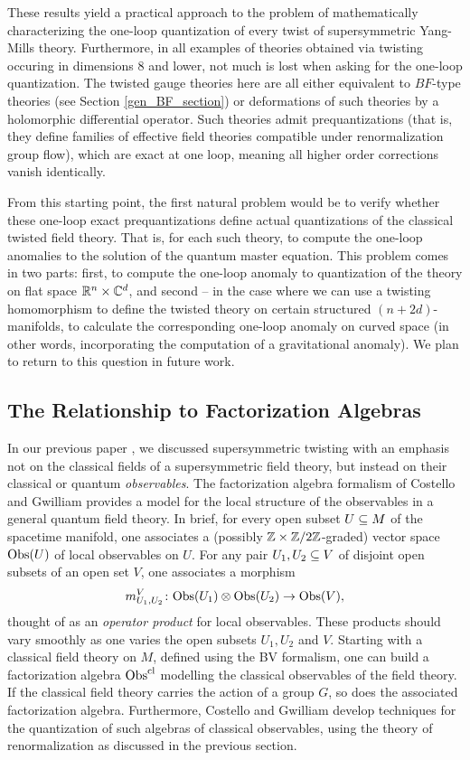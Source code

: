 \documentclass[10pt, oneside]{article}
\begin{document}
These results yield a practical approach to the problem of mathematically characterizing the one-loop quantization of every twist of supersymmetric Yang-Mills theory. Furthermore, in all examples of theories obtained via twisting occuring in dimensions 8 and lower, not much is lost when asking for the one-loop quantization.  The twisted gauge theories here are all either equivalent to $BF$-type theories (see Section \ref{gen_BF_section}) or deformations of such theories by a holomorphic differential operator.  Such theories admit prequantizations (that is, they define families of effective field theories compatible under renormalization group flow), which are exact at one loop, meaning all higher order corrections vanish identically.  

From this starting point, the first natural problem would be to verify whether these one-loop exact prequantizations define actual quantizations of the classical twisted field theory.  That is, for each such theory, to compute the one-loop anomalies to the solution of the quantum master equation.  This problem comes in two parts: first, to compute the one-loop anomaly to quantization of the theory on flat space $\mathbb R^n \times \mathbb C^d$, and second -- in the case where we can use a twisting homomorphism to define the twisted theory on certain structured $(n+2d)$-manifolds, to calculate the corresponding one-loop anomaly on curved space (in other words, incorporating the computation of a gravitational anomaly). We plan to return to this question in future work.

\subsection*{The Relationship to Factorization Algebras}
In our previous paper \cite{ElliottSafronov}, we discussed supersymmetric twisting with an emphasis not on the classical fields of a supersymmetric field theory, but instead on their classical or quantum \emph{observables}.  The factorization algebra formalism of Costello and Gwilliam \cite{Book1, Book2} provides a model for the local structure of the observables in a general quantum field theory.  In brief, for every open subset $U \subseteq M$ of the spacetime manifold, one associates a (possibly $\mathbb Z \times \mathbb Z/2\mathbb Z$-graded) vector space $\mathrm{Obs}(U)$ of local observables on $U$.  For any pair $U_1, U_2 \subseteq V$ of disjoint open subsets of an open set $V$, one associates a morphism
\[m_{U_1, U_2}^V \colon \mathrm{Obs}(U_1) \otimes \mathrm{Obs}(U_2)\to \mathrm{Obs}(V),\]
thought of as an \emph{operator product} for local observables.  These products should vary smoothly as one varies the open subsets $U_1, U_2$ and $V$.  Starting with a classical field theory on $M$, defined using the BV formalism, one can build a factorization algebra $\mathrm{Obs}^{\mathrm{cl}}$ modelling the classical observables of the field theory.  If the classical field theory carries the action of a group $G$, so does the associated factorization algebra.  Furthermore, Costello and Gwilliam develop techniques for the quantization of such algebras of classical observables, using the theory of renormalization as discussed in the previous section.
\end{document}
